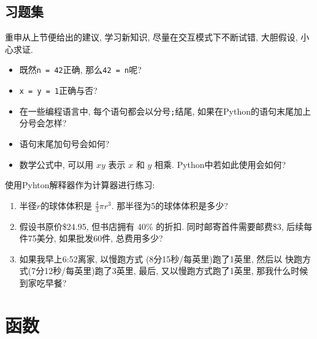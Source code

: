 \documentclass[10pt]{book}
\begin{document}
\section{习题集}

\begin{exercise}

重申从上节便给出的建议, 学习新知识, 
尽量在交互模式下不断试错, 大胆假设, 小心求证. 

\begin{itemize}

\item 既然{\tt n = 42}正确, 那么{\tt 42 = n}呢?

\item {\tt x = y = 1}正确与否?

\item 在一些编程语言中, 每个语句都会以分号{\tt ;}结尾, 
如果在Python的语句末尾加上分号会怎样?

\item 语句末尾加句号会如何?

\item 数学公式中, 可以用 $x y$ 表示 $x$ 和 $y$ 相乘. Python中若如此使用会如何?

\end{itemize}

\end{exercise}


\begin{exercise}

使用Pyhton解释器作为计算器进行练习:

\begin{enumerate}

\item 半径$r$的球体体积是 $\frac{4}{3} \pi r^3$. 那半径为5的球体体积是多少?

\item 假设书原价\$24.95, 但书店拥有 40\% 的折扣. 
同时邮寄首件需要邮费\$3, 后续每件75美分, 
如果批发60件, 总费用多少?

\item 如果我早上6:52离家, 以慢跑方式 (8分15秒/每英里)跑了1英里, 然后以
快跑方式(7分12秒/每英里)跑了3英里, 最后, 又以慢跑方式跑了1英里, 
那我什么时候到家吃早餐?

\end{enumerate}
\end{exercise}


\chapter{函数}
\label{funcchap}
\end{document}
